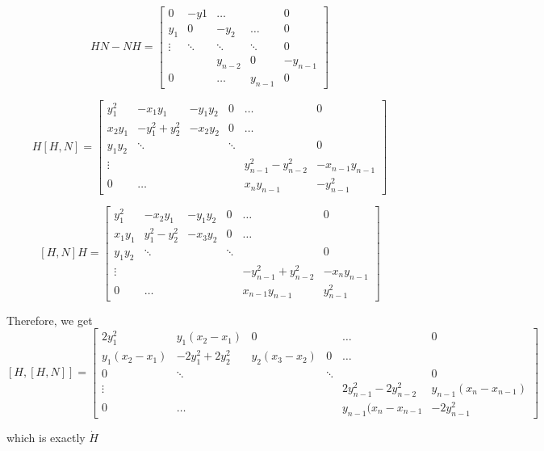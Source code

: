 \documentclass{article}
\begin{document}
\[ 
HN-NH = \begin{bmatrix}
        0 & -y1 & \hdots &  & 0 \\
        y_1 & 0 & -y_2 & \hdots & 0 \\
        \vdots & \ddots & \ddots & \ddots & 0\\
         & & y_{n-2}& 0 & -y_{n-1} \\
        0 & & \hdots & y_{n-1} & 0

    \end{bmatrix}
\]

\[ 
H[H,N] = \begin{bmatrix}
        y_1^2 & -x_1y_1 & -y_1y_2 & 0 &\hdots & 0 \\
        x_2y_1 & -y_1^2+y^2_2 & -x_2y_2 & 0 &\hdots & \\
        y_1y_2 & \ddots & & \ddots & & 0\\
        \vdots &  &  &  & y^2_{n-1}-y^2_{n-2} & -x_{n-1}y_{n-1} \\
        0 & \hdots & & & x_ny_{n-1} & -y^2_{n-1}

    \end{bmatrix}
\]

\[ 
[H,N]H = \begin{bmatrix}
        y_1^2 & -x_2y_1 & -y_1y_2 & 0 &\hdots & 0 \\
        x_1y_1 & y_1^2-y^2_2 & -x_3y_2 & 0 &\hdots & \\
        y_1y_2 & \ddots & & \ddots & & 0\\
        \vdots &  &  &  & -y^2_{n-1}+y^2_{n-2} & -x_{n}y_{n-1} \\
        0 & \hdots & & & x_{n-1}y_{n-1} & y^2_{n-1}

    \end{bmatrix}
\]

Therefore, we get 
\[ 
[H,[H,N]] = \begin{bmatrix}
        2y_1^2 & y_1(x_2-x_1) & 0 & &\hdots & 0 \\
        y_1(x_2-x_1) & -2y_1^2+2y^2_2 & y_2(x_3-x_2) & 0 &\hdots & \\
        0 & \ddots & & \ddots & & 0\\
        \vdots &  &  &  & 2y^2_{n-1}-2y^2_{n-2} & y_{n-1}(x_{n}-x_{n-1}) \\
        0 & \hdots & & & y_{n-1}(x_{n}-x_{n-1} & -2y^2_{n-1}

    \end{bmatrix}
\]

which is exactly $\dot{H}$
\end{document}
